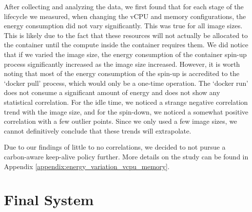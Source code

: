 \documentclass[times, 10pt,twocolumn]{article}
\begin{document}
After collecting and analyzing the data, we first found that for each stage of the lifecycle we measured, when changing the vCPU and memory configurations, the energy consumption did not vary significantly. This was true for all image sizes. This is likely due to the fact that these resources will not actually be allocated to the container until the compute inside the container requires them. We did notice that if we varied the image size, the energy consumption of the container spin-up process significantly increased as the image size increased. However, it is worth noting that most of the energy consumption of the spin-up is accredited to the `docker pull' process, which would only be a one-time operation. The `docker run' does not consume a significant amount of energy and does not show any statistical correlation. For the idle time, we noticed a strange negative correlation trend with the image size, and for the spin-down, we noticed a somewhat positive correlation with a few outlier points. Since we only used a few image sizes, we cannot definitively conclude that these trends will extrapolate.

Due to our findings of little to no correlations, we decided to not pursue a carbon-aware keep-alive policy further. More details on the study can be found in Appendix \ref{appendix:energy_variation_vcpu_memory}.







\section{Final System}
\end{document}
